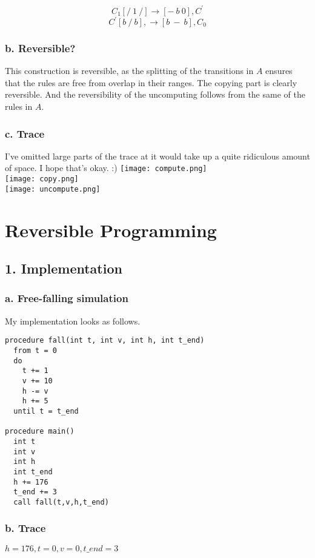 \documentclass[12pt]{report}
\begin{document}
      \begin{equation}
        C_1 [/\ 1\ /] \rightarrow  [-\ b\ 0], C^{\prime}  \label{eq:rule_C_F}
      \end{equation}
      \begin{equation}
        C^{\prime} [b\ /\ b], \rightarrow  [b\ -\ b], C_0  \label{eq:rule_C_F1}
      \end{equation}

    \subsubsection*{b. Reversible?}
      This construction is reversible, as the splitting of the transitions in $A$ ensures that the rules are free from overlap in their ranges. The copying part is clearly reversible. And the reversibility of the uncomputing follows from the same of the rules in $A$.

    \subsubsection*{c. Trace}
      I've omitted large parts of the trace at it would take up a quite ridiculous amount of space. I hope that's okay. :)
      \texttt{[image: compute.png]}\\
      \texttt{[image: copy.png]}\\
      \texttt{[image: uncompute.png]}

\section*{Reversible Programming}
  \subsection*{1. Implementation}
    \subsubsection*{a. Free-falling simulation}
      My implementation looks as follows.
    \begin{verbatim}
procedure fall(int t, int v, int h, int t_end)
  from t = 0
  do
    t += 1
    v += 10
    h -= v 
    h += 5
  until t = t_end

procedure main()
  int t
  int v
  int h
  int t_end
  h += 176
  t_end += 3
  call fall(t,v,h,t_end)
    \end{verbatim}
    \subsubsection*{b. Trace}
      $h = 176, t = 0, v = 0, t\_end = 3$
\end{document}

